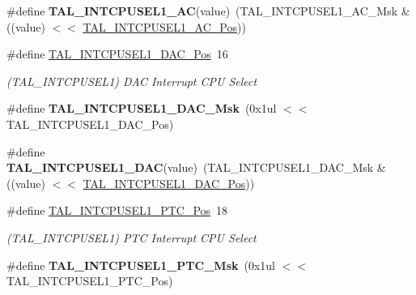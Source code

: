 \begin{DoxyCompactItemize}
\item 
\hypertarget{group___s_a_m_l21___t_a_l_gaf448b5fc760294b80200e0a9ee725b08}{}\#define {\bfseries T\+A\+L\+\_\+\+I\+N\+T\+C\+P\+U\+S\+E\+L1\+\_\+\+A\+C}(value)~(T\+A\+L\+\_\+\+I\+N\+T\+C\+P\+U\+S\+E\+L1\+\_\+\+A\+C\+\_\+\+Msk \& ((value) $<$$<$ \hyperlink{group___s_a_m_l21___t_a_l_ga6e4b11427dc799b52be28434544ac8b9}{T\+A\+L\+\_\+\+I\+N\+T\+C\+P\+U\+S\+E\+L1\+\_\+\+A\+C\+\_\+\+Pos}))\label{group___s_a_m_l21___t_a_l_gaf448b5fc760294b80200e0a9ee725b08}

\item 
\hypertarget{group___s_a_m_l21___t_a_l_gabfb1a7ee270c68a3e13d4c9a3ca9502f}{}\#define \hyperlink{group___s_a_m_l21___t_a_l_gabfb1a7ee270c68a3e13d4c9a3ca9502f}{T\+A\+L\+\_\+\+I\+N\+T\+C\+P\+U\+S\+E\+L1\+\_\+\+D\+A\+C\+\_\+\+Pos}~16\label{group___s_a_m_l21___t_a_l_gabfb1a7ee270c68a3e13d4c9a3ca9502f}

\begin{DoxyCompactList}\small\item\em (T\+A\+L\+\_\+\+I\+N\+T\+C\+P\+U\+S\+E\+L1) D\+A\+C Interrupt C\+P\+U Select \end{DoxyCompactList}\item 
\hypertarget{group___s_a_m_l21___t_a_l_ga2877f0794c949a1e7f6f2e9e385e2079}{}\#define {\bfseries T\+A\+L\+\_\+\+I\+N\+T\+C\+P\+U\+S\+E\+L1\+\_\+\+D\+A\+C\+\_\+\+Msk}~(0x1ul $<$$<$ T\+A\+L\+\_\+\+I\+N\+T\+C\+P\+U\+S\+E\+L1\+\_\+\+D\+A\+C\+\_\+\+Pos)\label{group___s_a_m_l21___t_a_l_ga2877f0794c949a1e7f6f2e9e385e2079}

\item 
\hypertarget{group___s_a_m_l21___t_a_l_ga76ae97401c4a68b40631a9a182aa0863}{}\#define {\bfseries T\+A\+L\+\_\+\+I\+N\+T\+C\+P\+U\+S\+E\+L1\+\_\+\+D\+A\+C}(value)~(T\+A\+L\+\_\+\+I\+N\+T\+C\+P\+U\+S\+E\+L1\+\_\+\+D\+A\+C\+\_\+\+Msk \& ((value) $<$$<$ \hyperlink{group___s_a_m_l21___t_a_l_gabfb1a7ee270c68a3e13d4c9a3ca9502f}{T\+A\+L\+\_\+\+I\+N\+T\+C\+P\+U\+S\+E\+L1\+\_\+\+D\+A\+C\+\_\+\+Pos}))\label{group___s_a_m_l21___t_a_l_ga76ae97401c4a68b40631a9a182aa0863}

\item 
\hypertarget{group___s_a_m_l21___t_a_l_gaa6fa1abcdbb81fe05838f1d65e449adf}{}\#define \hyperlink{group___s_a_m_l21___t_a_l_gaa6fa1abcdbb81fe05838f1d65e449adf}{T\+A\+L\+\_\+\+I\+N\+T\+C\+P\+U\+S\+E\+L1\+\_\+\+P\+T\+C\+\_\+\+Pos}~18\label{group___s_a_m_l21___t_a_l_gaa6fa1abcdbb81fe05838f1d65e449adf}

\begin{DoxyCompactList}\small\item\em (T\+A\+L\+\_\+\+I\+N\+T\+C\+P\+U\+S\+E\+L1) P\+T\+C Interrupt C\+P\+U Select \end{DoxyCompactList}\item 
\hypertarget{group___s_a_m_l21___t_a_l_gaac15bffa59e07ee4d2b16d4840f32f6b}{}\#define {\bfseries T\+A\+L\+\_\+\+I\+N\+T\+C\+P\+U\+S\+E\+L1\+\_\+\+P\+T\+C\+\_\+\+Msk}~(0x1ul $<$$<$ T\+A\+L\+\_\+\+I\+N\+T\+C\+P\+U\+S\+E\+L1\+\_\+\+P\+T\+C\+\_\+\+Pos)\label{group___s_a_m_l21___t_a_l_gaac15bffa59e07ee4d2b16d4840f32f6b}


\end{DoxyCompactItemize}
